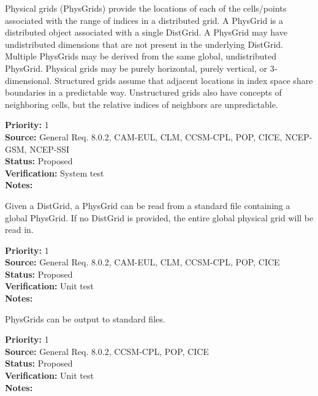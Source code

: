 
Physical grids (PhysGrids) provide the locations of each of the cells/points
associated with the range of indices in a distributed grid.  A PhysGrid is a
distributed object associated with a single DistGrid.  A PhysGrid may have
undistributed dimensions that are not present in the underlying DistGrid. 
Multiple PhysGrids may be derived from the same global, undistributed PhysGrid. 
Physical grids may be purely horizontal, purely vertical, or 3-dimensional. 
Structured grids assume that adjacent locations in index space share boundaries
in a predictable way.  Unstructured grids also have concepts of neighboring
cells, but the relative indices of neighbors are unpredictable.

\begin{reqlist}
{\bf Priority:} 1 \\
{\bf Source:} General Req. 8.0.2, CAM-EUL, CLM, CCSM-CPL, POP, CICE, NCEP-GSM, NCEP-SSI \\
{\bf Status:} Proposed \\
{\bf Verification:} System test\\
{\bf Notes:}
\end{reqlist}

Given a DistGrid, a PhysGrid can be read from a standard file containing a
global PhysGrid. If no DistGrid is provided, the entire global physical grid will
be read in.
\begin{reqlist}
{\bf Priority:} 1 \\
{\bf Source:} General Req. 8.0.2, CAM-EUL, CLM, CCSM-CPL, POP, CICE \\
{\bf Status:} Proposed \\
{\bf Verification:} Unit test\\
{\bf Notes:} 
\end{reqlist}

PhysGrids can be output to standard files.
\begin{reqlist}
{\bf Priority:} 1 \\
{\bf Source:} General Req. 8.0.2, CCSM-CPL, POP, CICE \\
{\bf Status:} Proposed \\
{\bf Verification:} Unit test\\
{\bf Notes:} 
\end{reqlist}

